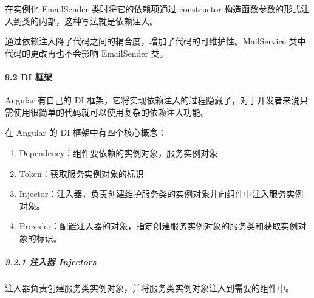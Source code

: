 \documentclass[
]{article}
\begin{document}
在实例化 EmailSender 类时将它的依赖项通过 constructor
构造函数参数的形式注入到类的内部，这种写法就是依赖注入。

通过依赖注入降了代码之间的耦合度，增加了代码的可维护性。MailService
类中代码的更改再也不会影响 EmailSender 类。

\hypertarget{92-di-ux6846ux67b6}{%
\paragraph{9.2 DI 框架}\label{92-di-ux6846ux67b6}}

Angular 有自己的 DI
框架，它将实现依赖注入的过程隐藏了，对于开发者来说只需使用很简单的代码就可以使用复杂的依赖注入功能。

在 Angular 的 DI 框架中有四个核心概念：

\begin{enumerate}
\def\labelenumi{\arabic{enumi}.}
\item
  Dependency：组件要依赖的实例对象，服务实例对象
\item
  Token：获取服务实例对象的标识
\item
  Injector：注入器，负责创建维护服务类的实例对象并向组件中注入服务实例对象。
\item
  Provider：配置注入器的对象，指定创建服务实例对象的服务类和获取实例对象的标识。
\end{enumerate}

\hypertarget{921-ux6ce8ux5165ux5668-injectors}{%
\subparagraph{9.2.1 注入器
Injectors}\label{921-ux6ce8ux5165ux5668-injectors}}

注入器负责创建服务类实例对象，并将服务类实例对象注入到需要的组件中。
\end{document}
